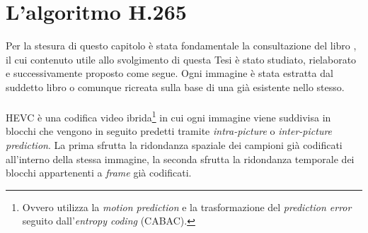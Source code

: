 
\chapter{L'algoritmo H.265} %
\label{Chapter4} %

Per la stesura di questo capitolo è stata fondamentale la consultazione del
libro \citep{BookHEVC}, il cui contenuto utile allo svolgimento di questa Tesi è
stato studiato, rielaborato e successivamente proposto come segue. Ogni immagine
è stata estratta dal suddetto libro o comunque ricreata sulla base di una già
esistente nello stesso.
\\ \\
HEVC è una codifica video ibrida\footnote{Ovvero utilizza la \emph{motion 
prediction} e la trasformazione del \emph{prediction error} seguito
dall'\emph{entropy coding} (CABAC).} in cui ogni immagine viene suddivisa in 
blocchi  che vengono in seguito predetti tramite \emph{intra-picture} o
\emph{inter-picture prediction}. La prima sfrutta la ridondanza spaziale dei
campioni già codificati all'interno della stessa immagine, la seconda sfrutta
la ridondanza temporale dei blocchi appartenenti a \emph{frame} già codificati.

